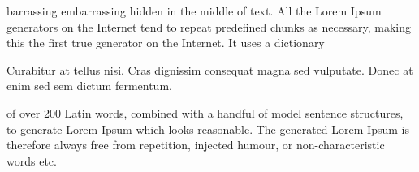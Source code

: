 \documentclass[11pt,letterpaper,openany]{scrbook}
\begin{document}
\begin{sloppypar}
\begin{paracol}{2}\fontsize{13}{15}\centerfont barrassing embarrassing hidden in the middle of text. All the Lorem Ipsum generators on the Internet tend to repeat predefined chunks as necessary, making this the first true generator on the Internet. It uses a dictionary 

\switchcolumn

\fontsize{11}{13}\rightfont Curabitur at tellus nisi. Cras dignissim consequat magna sed vulputate. Donec at enim sed sem dictum fermentum. 

\end{paracol}



\begin{paracol}{1}

\fontsize{13}{15}\centerfont of over 200 Latin words, combined with a handful of model sentence structures, to generate Lorem Ipsum which looks reasonable. The generated Lorem Ipsum is therefore always free from repetition, injected humour, or non-characteristic words etc. 

\end{paracol}

\end{sloppypar}
\end{document}
